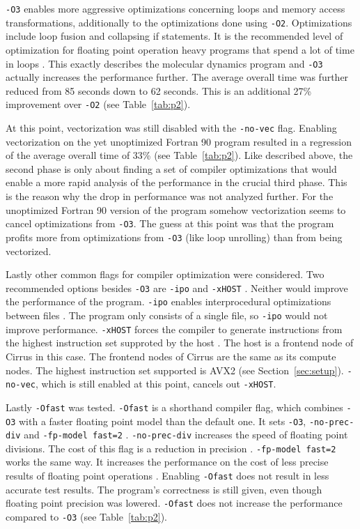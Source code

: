 \documentclass[twoside,11pt]{article}
\begin{document}
\texttt{-O3} enables more aggressive optimizations concerning loops
and memory access transformations, additionally to the optimizations
done using \texttt{-O2}.
Optimizations include loop fusion and collapsing if statements.
It is the recommended level of optimization for floating point
operation heavy programs that spend a lot of time in loops
\citep{o}.
This exactly describes the molecular dynamics program and
\texttt{-O3} actually increases the performance further.
The average overall time was further reduced from 85 seconds down
to 62 seconds.
This is an additional 27\% improvement over \texttt{-O2}
(see Table~\ref{tab:p2}).

At this point, vectorization was still disabled with the
\texttt{-no-vec} flag.
Enabling vectorization on the yet unoptimized Fortran 90 program
resulted in a regression of the average overall time of 33\%
(see Table~\ref{tab:p2}).
Like described above, the second phase is only about finding a
set of compiler optimizations that would enable a more rapid analysis
of the performance in the crucial third phase.
This is the reason why the drop in performance was not analyzed
further.
For the unoptimized Fortran 90 version of the program somehow
vectorization seems to cancel optimizations from \texttt{-O3}.
The guess at this point was that the program profits more from
optimizations from \texttt{-O3} (like loop unrolling) than
from being vectorized.

Lastly other common flags for compiler optimization were considered.
Two recommended options besides \texttt{-O3} are \texttt{-ipo} and
\texttt{-xHOST} \citep{user389}.
Neither would improve the performance of the program.
\texttt{-ipo} enables interprocedural optimizations between files
\citep{ipo}.
The program only consists of a single file, so \texttt{-ipo} would
not improve performance.
\texttt{-xHOST} forces the compiler to generate instructions from the
highest instruction set supproted by the host \citep{xhost}.
The host is a frontend node of Cirrus in this case.
The frontend nodes of Cirrus are the same as its compute nodes.
The highest instruction set supported is AVX2
(see Section~\ref{sec:setup}).
\texttt{-no-vec}, which is still enabled at this point, cancels out
\texttt{-xHOST}.

Lastly \texttt{-Ofast} was tested.
\texttt{-Ofast} is a shorthand compiler flag, which combines
\texttt{-O3} with a faster floating point model than the default one.
It sets \texttt{-O3}, \texttt{-no-prec-div} and
\texttt{-fp-model fast=2} \citep{ofast}.
\texttt{-no-prec-div} increases the speed of floating point divisions.
The cost of this flag is a reduction in precision \citep{no_prec_div}.
\texttt{-fp-model fast=2} works the same way.
It increases the performance on the cost of less precise results of
floating point operations \citep{fp_model}.
Enabling \texttt{-Ofast} does not result in less accurate test
results.
The program's correctness is still given, even though floating point
precision was lowered.
\texttt{-Ofast} does not increase the performance compared to
\texttt{-O3} (see Table~\ref{tab:p2}).
\end{document}

